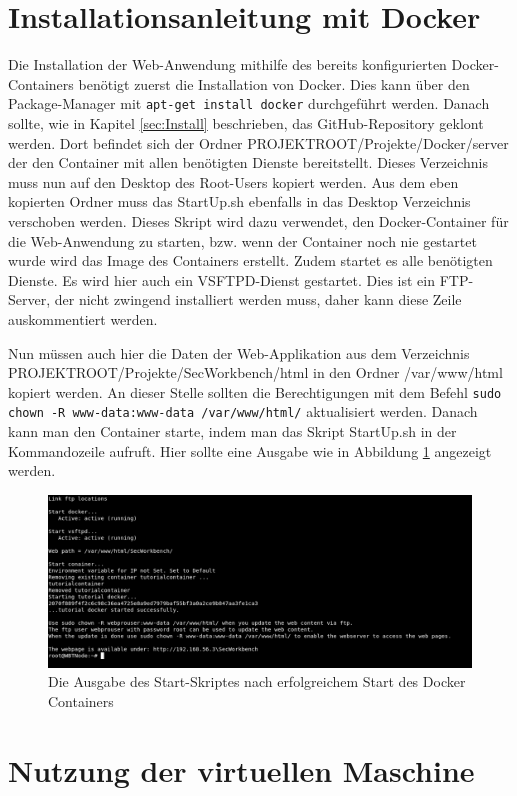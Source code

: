 \section{Installationsanleitung mit Docker}

Die Installation der Web-Anwendung mithilfe des bereits konfigurierten Docker-Containers benötigt zuerst die Installation von Docker. Dies kann über den Package-Manager mit \colorbox{altgray}{\lstinline|apt-get install docker|} durchgeführt werden. Danach sollte, wie in Kapitel \ref{sec:Install} beschrieben, das GitHub-Repository geklont werden. Dort befindet sich der Ordner PROJEKTROOT/Projekte/Docker/server der den Container mit allen benötigten Dienste bereitstellt. Dieses Verzeichnis muss nun auf den Desktop des Root-Users kopiert werden. Aus dem eben kopierten Ordner muss das StartUp.sh ebenfalls in das Desktop Verzeichnis verschoben werden. Dieses Skript wird dazu verwendet, den Docker-Container für die Web-Anwendung zu starten, bzw. wenn der Container noch nie gestartet wurde wird das Image des Containers erstellt. Zudem startet es alle benötigten Dienste. Es wird hier auch ein VSFTPD-Dienst gestartet. Dies ist ein FTP-Server, der nicht zwingend installiert werden muss, daher kann diese Zeile auskommentiert werden.\medskip

Nun müssen auch hier die Daten der Web-Applikation aus dem Verzeichnis PROJEKTROOT/Projekte/SecWorkbench/html in den Ordner /var/www/html kopiert werden. An dieser Stelle sollten die Berechtigungen mit dem Befehl \colorbox{altgray}{\lstinline|sudo chown -R www-data:www-data /var/www/html/|} aktualisiert werden. Danach kann man den Container starte, indem man das Skript StartUp.sh in der Kommandozeile aufruft. Hier sollte eine Ausgabe wie in Abbildung \ref{fig:startUp} angezeigt werden.

\begin{figure}[H]
	\centering
	\includegraphics[width=\textwidth]{images/Installation/startUp.png}
	\caption{Die Ausgabe des Start-Skriptes nach erfolgreichem Start des Docker Containers}
	\label{fig:startUp}
\end{figure}

\section{Nutzung der virtuellen Maschine}


